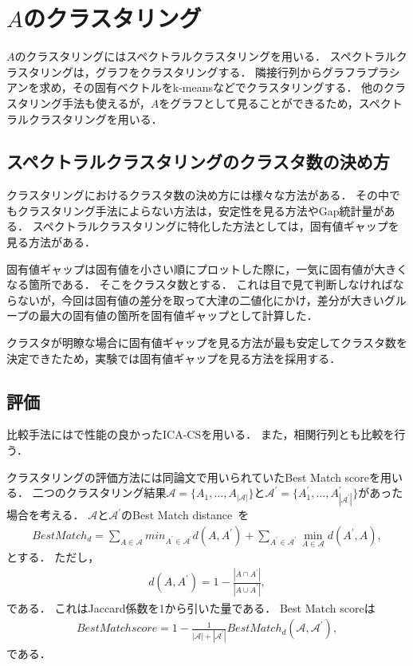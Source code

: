 \section{$A$のクラスタリング}
$A$のクラスタリングにはスペクトラルクラスタリングを用いる．
スペクトラルクラスタリングは，グラフをクラスタリングする．
隣接行列からグラフラプラシアンを求め，その固有ベクトルをk-meansなどでクラスタリングする．
他のクラスタリング手法も使えるが，$A$をグラフとして見ることができるため，スペクトラルクラスタリングを用いる．
\subsection{スペクトラルクラスタリングのクラスタ数の決め方}
クラスタリングにおけるクラスタ数の決め方には様々な方法がある．
その中でもクラスタリング手法によらない方法は，安定性を見る方法\cite{Ben-Hur}やGap統計量\cite{Tibshirani}がある．
スペクトラルクラスタリングに特化した方法としては，固有値ギャップを見る方法\cite{VonLuxburg}がある．

固有値ギャップは固有値を小さい順にプロットした際に，一気に固有値が大きくなる箇所である．
そこをクラスタ数とする．
これは目で見て判断しなければならないが，今回は固有値の差分を取って大津の二値化にかけ，差分が大きいグループの最大の固有値の箇所を固有値ギャップとして計算した．

クラスタが明瞭な場合に固有値ギャップを見る方法が最も安定してクラスタ数を決定できたため，実験では固有値ギャップを見る方法を採用する．

\subsection{評価}
比較手法には\cite{Molter2018}で性能の良かったICA-CSを用いる．
また，相関行列とも比較を行う．

クラスタリングの評価方法には同論文で用いられていたBest Match scoreを用いる．
二つのクラスタリング結果$\mathcal{A} = \{A_1, \dots, A_{|\mathcal{A}|}\}$と$\mathcal{A^\prime} = \{A^\prime_1, \dots, A^\prime_{|\mathcal{A}^\prime|}\}$があった場合を考える．
$\mathcal{A}$と$\mathcal{A^\prime}$のBest Match distance~\cite{Goldberg2010}を
\begin{align}
	BestMatch_d = \sum_{A \in \mathcal{A}} min_{A^\prime \in \mathcal{A^\prime}} d(A, A^\prime) + \sum_{A^\prime \in \mathcal{A^\prime}} \min_{A \in \mathcal{A}} d(A^\prime, A),
\end{align}
とする．
ただし，
\begin{align}
	d(A,A^\prime) = 1 - \frac{|A \cap A^\prime|}{|A \cup A^\prime|},
\end{align}
である．
これはJaccard係数を1から引いた量である．
Best Match scoreは
\begin{align}
	Best Match score = 1 - \frac{1}{|\mathcal{A}| + |\mathcal{A^\prime}|} BestMatch_d(\mathcal{A}, \mathcal{A^\prime}),
\end{align}
である．
